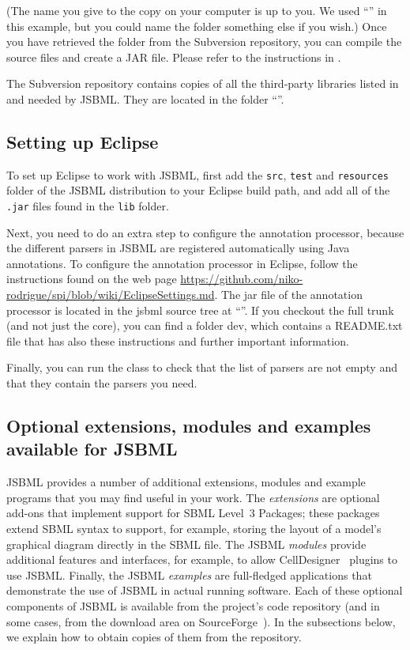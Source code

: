 (The name you give to the copy on your computer is up to you.  We used
``\dirname'' in this example, but you could name the folder something else
if you wish.)  Once you have retrieved the folder from the Subversion
repository, you can compile the source files and create a JAR file.  Please
refer to the instructions in .

The Subversion repository contains copies of all the third-party libraries
listed in  and needed by JSBML.  They are
located in the folder ``\dirname''.


\subsection{Setting up Eclipse}
\label{sec:SettingUpEclipse}

To set up Eclipse to work with JSBML, first add the \texttt{src},
\texttt{test} and \texttt{resources} folder of the JSBML distribution to your
Eclipse build path, and add all of the \texttt{.jar} files found in the
\texttt{lib} folder.

Next, you need to do an extra step to configure the annotation processor,
because the different parsers in JSBML are registered automatically using
Java annotations.  To configure the annotation processor in Eclipse, follow
the instructions found on the web page
\url{https://github.com/niko-rodrigue/spi/blob/wiki/EclipseSettings.md}.
 The jar file of the annotation processor is located in the jsbml source tree at
 ``\dirname''. If you checkout 
the full trunk (and not just the core), you can find a folder dev, which 
contains a README.txt file that has also these instructions and further 
important information.

Finally, you can run the  class to check that the list of
parsers are not empty and that they contain the parsers you need.


\subsection{Optional extensions, modules and examples available for JSBML}
\label{sec:dependencies}

JSBML provides a number of additional extensions, modules and example
programs that you may find useful in your work.  The \emph{extensions} are
optional add-ons that implement support for SBML Level~3 Packages; these
packages extend SBML syntax to support, for example, storing the layout of
a model's graphical diagram directly in the SBML file.  The JSBML
\emph{modules} provide additional features and interfaces, for example, to
allow CellDesigner~\cite{Funahashi2003} plugins to use JSBML.  Finally, the
JSBML \emph{examples} are full-fledged applications that demonstrate the
use of JSBML in actual running software.  Each of these optional components
of JSBML is available from the project's code repository (and in some
cases, from the download area on SourceForge~\cite{JSBMLdownload}).  In the
subsections below, we explain how to obtain copies of them from the
repository.


